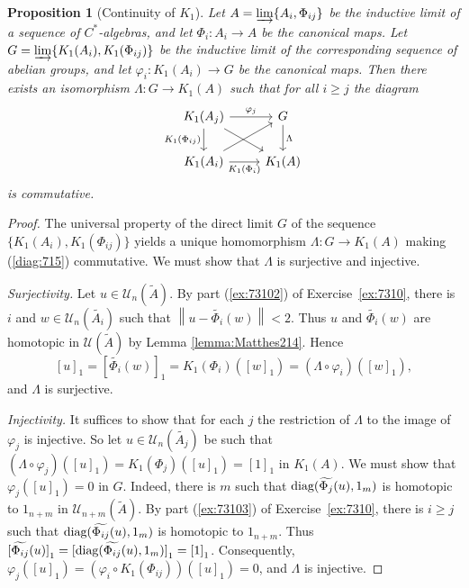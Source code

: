 \documentclass{book}
\newtheorem{proposition}[definition]{Proposition}
\def\cstars{\(C^*\)-algebras}
\def\diag{\textnormal{diag}}
\begin{document}
\begin{proposition}[Continuity of \(K_1\)]
  Let \(A=\varinjlim\{A_i,\Phi_{ij}\}\) be the inductive limit of a sequence of \cstars,
  and let \(\Phi_i:A_i\rightarrow A\) be the canonical maps. Let \(G=\varinjlim\{K_1(A_i),K_1(\Phi_{ij})\}\)
  be the inductive limit of the corresponding sequence of abelian groups, and let
  \(\varphi_i:K_1(A_i)\rightarrow G\) be the canonical maps. Then there exists an isomorphism \(\Lambda:G\rightarrow K_1(A)\) such that for all \(i\geq j\) the diagram
  \begin{equation}\label{diag:715}
    \begin{tikzcd}
      K_1(A_j)\arrow[r,"\varphi_j"]\arrow[d,swap,"K_1(\Phi_{ij})"]\arrow[dr]&G\arrow[d,"\Lambda"]\\
      K_1(A_i)\arrow[r,swap,"K_1(\Phi_i)"]\arrow[ur]& K_1(A)
    \end{tikzcd}
  \end{equation}
  is commutative.
\end{proposition}
\begin{proof}
  The universal property of the direct limit \(G\) of the sequence \(\{K_1(A_i),K_1(\Phi_{ij})\}\) yields
  a unique homomorphism \(\Lambda:G\rightarrow K_1(A)\) making (\ref{diag:715}) commutative. We must show that \(\Lambda\) is surjective and injective.\par
  \textit{Surjectivity.} Let \(u\in\mathcal{U}_n(\tilde{A})\). By part (\ref{ex:73102}) of Exercise~\ref{ex:7310}, there is \(i\) and \(w\in\mathcal{U}_n(\tilde{A_i})\)
  such that \(\left\|u-\widetilde{\Phi_i}(w)\right\|<2\). Thus \(u\) and \(\widetilde{\Phi_i}(w)\) are homotopic in \(\mathcal{U}(\tilde{A})\) by Lemma \ref{lemma:Matthes214}.
  Hence
  \[
    {[u]}_1={[\widetilde{\Phi_i}(w)]}_1=K_1(\Phi_i)({[w]}_1)=(\Lambda\circ\varphi_i)({[w]}_1),
  \]
  and \(\Lambda\) is surjective.\par
  \textit{Injectivity.} It suffices to show that for each \(j\) the restriction of \(\Lambda\) to the image of \(\varphi_j\) is injective.
  So let \(u\in\mathcal{U}_n(\tilde{A_j})\) be such that \((\Lambda\circ\varphi_j)({[u]}_1)=K_1(\Phi_j)({[u]}_1)={[1]}_1\) in \(K_1(A)\).
  We must show that \(\varphi_j({[u]}_1)=0\) in \(G\). Indeed, there is \(m\) such that \(\diag(\widetilde{\Phi_j}(u),1_m)\) is homotopic to \(1_{n+m}\) in \(\mathcal{U}_{n+m}(\tilde{A})\).
  By part (\ref{ex:73103}) of Exercise~\ref{ex:7310}, there is \(i\geq j\) such that
  \(\diag(\widetilde{\Phi_{ij}}(u),1_m)\) is homotopic to \(1_{n+m}\).
  Thus \({[\widetilde{\Phi_{ij}}(u)]}_1={[\diag(\widetilde{\Phi_{ij}}(u),1_m)]}_1={[1]}_1\).
  Consequently, \(\varphi_j({[u]}_1)=(\varphi_i\circ K_1(\Phi_{ij}))({[u]}_1)=0\), and \(\Lambda\) is injective.
\end{proof}
\end{document}
